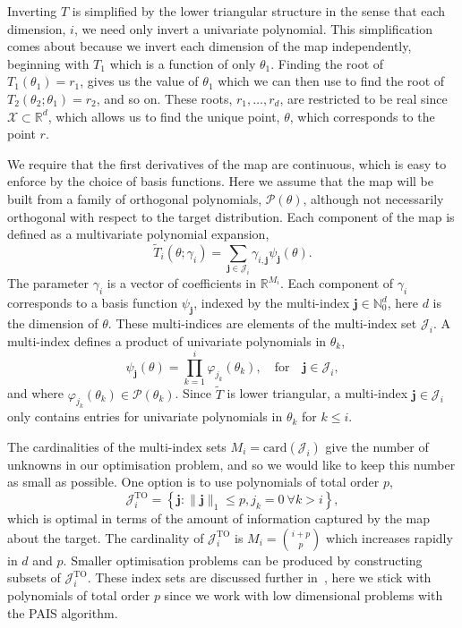 \documentclass[final]{siamltex}
\begin{document}
Inverting $T$ is simplified by the lower triangular structure in the sense that each dimension, $i$, we need only invert a univariate polynomial. This simplification comes about because we invert each dimension of the map independently, beginning with $T_1$ which is a function of only $\theta_1$. Finding the root of $T_1(\theta_1) = r_1$, gives us the value of $\theta_1$ which we can then use to find the root of $T_2(\theta_2;\theta_1) = r_2$, and so on. These roots, $r_1,\dots,r_d$, are restricted to be real since $\mathcal{X} \subset \mathbb{R}^d$, which allows us to find the unique point, $\theta$, which corresponds to the point $r$.

We require that the first derivatives of the map are continuous, which is easy to enforce by the choice of basis functions. Here we assume that the map will be built from a family of orthogonal polynomials, $\mathcal{P}(\theta)$, although not necessarily orthogonal with respect to the target distribution. Each component of the map is defined as a multivariate polynomial expansion,
\begin{equation}\label{eq:map_defn}
	\tilde{T}_i(\theta; \gamma_i) = \sum\limits_{\mathbf{j}\in\mathcal{J}_i} \!
\gamma_{i,\mathbf{j}}\psi_\mathbf{j}(\theta).
\end{equation}
The parameter $\gamma_i$ is a vector of coefficients in $\mathbb{R}^{M_i}$. Each component of $\gamma_i$ corresponds to a basis function
$\psi_\mathbf{j}$, indexed by the multi-index $\mathbf{j} \in \mathbb{N}_0^d$, here $d$ is the dimension of
$\theta$. These multi-indices are elements of the multi-index set $\mathcal{J}_i$. A multi-index defines a product of univariate polynomials in $\theta_k$,
\[
	\psi_\mathbf{j}(\theta) = \prod\limits_{k=1}^i \! \varphi_{j_k}(\theta_k), \quad \text{for} \quad \mathbf{j} \in \mathcal{J}_i,
\]
and where $\varphi_{j_k}(\theta_k) \in \mathcal{P}(\theta_k)$. Since $\tilde{T}$ is lower triangular, a multi-index $\mathbf{j}\in\mathcal{J}_i$ only contains entries for univariate polynomials in $\theta_k$ for $k\leq i$.

The cardinalities of the multi-index sets $M_i = \text{card}(\mathcal{J}_i)$ give the number of unknowns in our
optimisation problem, and so we would like to keep this number as small as possible. One option is
to use polynomials of total order $p$,
\[
	\mathcal{J}_i^\text{TO} = \left\{\mathbf{j}:\|\mathbf{j}\|_1 \leq p, j_k = 0\ \forall k > i\right\},
\]
which is optimal in terms of the amount of information captured by the map about the target. The cardinality of $\mathcal{J}_i^\text{TO}$ is $M_i = {i+p \choose p}$ which increases rapidly in $d$ and $p$. Smaller optimisation problems can be produced by constructing subsets of $\mathcal{J}_i^\text{TO}$. These index sets are discussed further
in~\cite{parno2014transport}, here we stick with polynomials of total order $p$ since we work with low dimensional problems with the PAIS algorithm.
\end{document}
